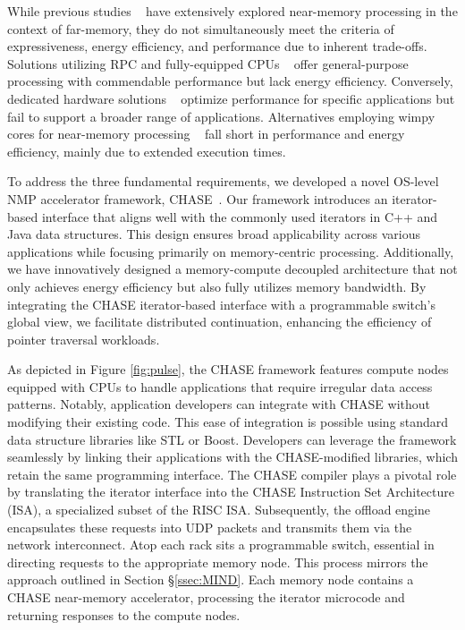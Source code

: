 While previous studies ~\cite{strom, clio, impica, aifm} have extensively explored near-memory processing in the context of far-memory, they do not simultaneously meet the criteria of expressiveness, energy efficiency, and performance due to inherent trade-offs. Solutions utilizing RPC and fully-equipped CPUs ~\cite{aifm, zhang2022_teleport} offer general-purpose processing with commendable performance but lack energy efficiency. Conversely, dedicated hardware solutions ~\cite{strom, impica} optimize performance for specific applications but fail to support a broader range of applications. Alternatives employing wimpy cores for near-memory processing ~\cite{clio} fall short in performance and energy efficiency, mainly due to extended execution times.

To address the three fundamental requirements, we developed a novel OS-level NMP accelerator framework, CHASE~\cite{chase}. Our framework introduces an iterator-based interface that aligns well with the commonly used iterators in C++ and Java data structures. This design ensures broad applicability across various applications while focusing primarily on memory-centric processing. Additionally, we have innovatively designed a memory-compute decoupled architecture that not only achieves energy efficiency but also fully utilizes memory bandwidth. By integrating the CHASE iterator-based interface with a programmable switch's global view, we facilitate distributed continuation, enhancing the efficiency of pointer traversal workloads. 


As depicted in Figure \ref{fig:pulse}, the CHASE framework features compute nodes equipped with CPUs to handle applications that require irregular data access patterns. Notably, application developers can integrate with CHASE without modifying their existing code. This ease of integration is possible using standard data structure libraries like STL or Boost. Developers can leverage the framework seamlessly by linking their applications with the CHASE-modified libraries, which retain the same programming interface. The CHASE compiler plays a pivotal role by translating the iterator interface into the CHASE Instruction Set Architecture (ISA), a specialized subset of the RISC ISA. Subsequently, the offload engine encapsulates these requests into UDP packets and transmits them via the network interconnect. Atop each rack sits a programmable switch, essential in directing requests to the appropriate memory node. This process mirrors the approach outlined in Section \S\ref{ssec:MIND}. Each memory node contains a CHASE near-memory accelerator, processing the iterator microcode and returning responses to the compute nodes.

